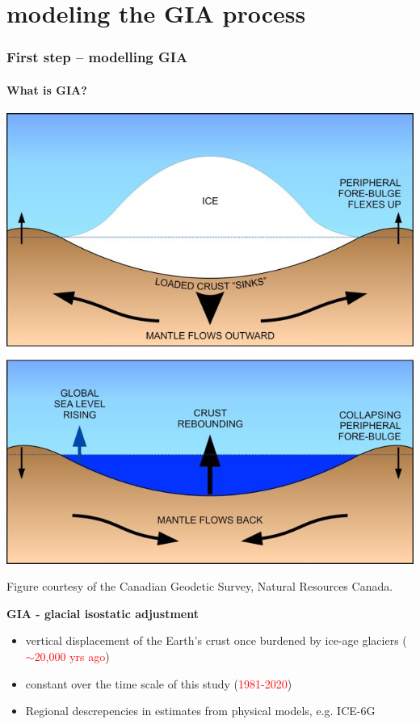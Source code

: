 \documentclass{beamer}
\begin{document}
\section{modeling the GIA process}
\begin{frame}
\frametitle{First step -- modelling GIA}
\framesubtitle{What is GIA?}


\begin{minipage}[c]{0.4\textwidth}
\includegraphics[width = \textwidth]{images/gia}

\tiny{Figure courtesy of the Canadian Geodetic Survey, Natural Resources Canada.}
\end{minipage}%
\hfill
\begin{minipage}[c]{0.55\textwidth}
\textbf{GIA - glacial isostatic adjustment}
\begin{itemize}
\item  vertical displacement of the Earth's crust once burdened by ice-age glaciers (\textcolor{red}{$\sim$20,000 yrs ago})
\item  constant over the time scale of this study (\textcolor{red}{1981-2020})
\item Regional descrepencies in estimates from physical models, e.g. ICE-6G \citep{Peltier}
\end{itemize}
\end{minipage}


\end{frame}
\end{document}
